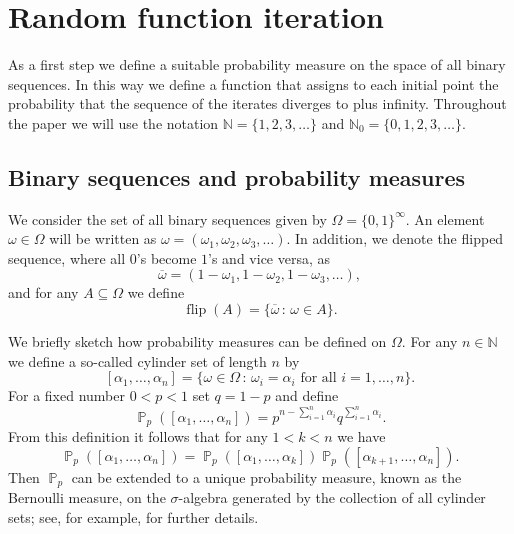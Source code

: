 \documentclass[a4paper,12pt]{article}
\DeclareMathOperator{\prob}{\mathbb{P}}
\DeclareMathOperator{\rec}{flip}
\begin{document}

\newpage

\section{Random function iteration}
\label{sec:iteration}

As a first step we define a suitable probability measure on the space of all binary sequences. In this way we define a function that assigns to each initial point the probability that the sequence of the iterates diverges to plus infinity. Throughout the paper we will use the notation $\mathbb{N} = \{1,2,3,\dots\}$ and $\mathbb{N}_0 = \{0,1,2,3,\dots\}$. 


\subsection{Binary sequences and probability measures}

We consider the set of all binary sequences given by $\Omega = \{0,1\}^\infty$. An element $\omega \in \Omega$ will be written as $\omega = (\omega_1,\omega_2,\omega_3,\dots)$. In addition, we denote the flipped sequence, where all $0$'s become $1$'s and vice versa, as
\[
\overline{\omega} = (1-\omega_1,1-\omega_2,1-\omega_3,\dots),
\]
and for any $A \subseteq \Omega$ we define
\[
\rec(A) = \{\overline{\omega} \,:\, \omega \in A\}.
\]

We briefly sketch how probability measures can be defined on $\Omega$. For any $n \in \mathbb{N}$ we define a so-called cylinder set of length $n$ by
\[
[\alpha_1,\dots,\alpha_n] = \{ \omega \in \Omega \,:\, \omega_i = \alpha_i \text{ for all } i=1,\dots,n \}.
\]
For a fixed number $0 < p < 1$ set $q = 1-p$ and define
\[
\prob_p([\alpha_1,\dots,\alpha_n]) = p^{n-\sum_{i=1}^n \alpha_i} q^{\sum_{i=1}^n \alpha_i}.
\]
From this definition it follows that for any $1 < k < n$ we have
\begin{equation}
\label{eq:cylinder_split}
\prob_p([\alpha_1,\dots,\alpha_n])
	= \prob_p([\alpha_1,\dots,\alpha_k])\prob_p([\alpha_{k+1},\dots,\alpha_n]).
\end{equation}
Then $\prob_p$ can be extended to a unique probability measure, known as the Bernoulli measure, on the $\sigma$-algebra generated by the collection of all cylinder sets; see, for example, \cite{Berger:2001, DajaniKalle:2021} for further details.
\end{document}
